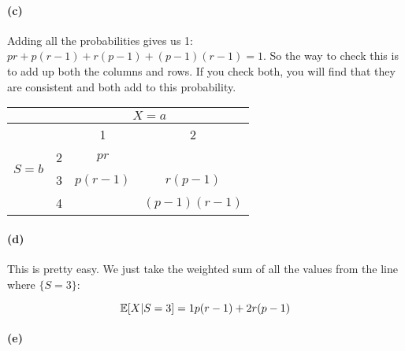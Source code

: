 \documentclass[a4paper]{article}
\begin{document}
\paragraph{(c)}

Adding all the probabilities gives us 1: $pr + p(r-1) + r(p-1) + (p-1)(r-1) = 1$. So the way to check this is to add up both the columns and rows. If you check both, you will find that they are consistent and both add to this probability. \\

\renewcommand\arraystretch{1.5}
\begin{tabular}{ c | c | c | c }
& \multicolumn{3}{c}{$X = a$} \\
\hline
\multirow{4}{*}{$S=b$} & & 1 & 2 \\
\cline{2-4}
& 2 & $pr$ & \\
\cline{2-4}
& 3 & $p(r-1)$ & $r(p-1)$  \\
\cline{2-4}
& 4 & & $(p-1)(r-1)$ \\
\end{tabular}

\paragraph{(d)}

This is pretty easy. We just take the weighted sum of all the values from the line where $\{S = 3\}$:

\begin{equation}
\mathbb{E}[X | S = 3] = 1p(r-1) + 2r(p-1)
\end{equation}

\paragraph{(e)}
\end{document}
